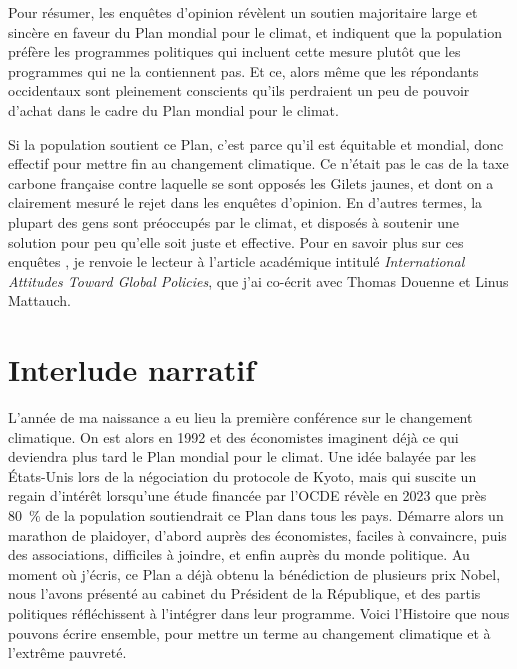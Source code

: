 \documentclass[a5paper,french,openany]{memoir}
\begin{document}
Pour résumer, les enquêtes d'opinion révèlent un soutien majoritaire large et sincère en faveur du Plan mondial pour le climat, et indiquent que la population préfère les programmes politiques qui incluent cette mesure plutôt que les programmes qui ne la contiennent pas. Et ce, alors même que les répondants occidentaux sont pleinement conscients qu'ils perdraient un peu de pouvoir d'achat dans le cadre du Plan mondial pour le climat. 

Si la population soutient ce Plan, c'est parce qu'il est équitable et mondial, donc effectif pour mettre fin au changement climatique. Ce n'était pas le cas de la taxe carbone française contre laquelle se sont opposés les Gilets jaunes, et dont on a clairement mesuré le rejet dans les enquêtes d'opinion. En d'autres termes, la plupart des gens sont préoccupés par le climat, et disposés à soutenir une solution pour peu qu'elle soit juste et effective. 
Pour en savoir plus sur ces enquêtes%
, je renvoie le lecteur à l'article académique intitulé \textit{International Attitudes Toward Global Policies}, que j'ai co-écrit avec Thomas Douenne et Linus Mattauch. 

\chapter{Interlude narratif}

L'année de ma naissance a eu lieu la première conférence sur le changement climatique. On est alors en 1992 et des économistes imaginent déjà ce qui deviendra plus tard le Plan mondial pour le climat. Une idée balayée par les États-Unis lors de la négociation du protocole de Kyoto, mais qui suscite un regain d'intérêt lorsqu'une étude financée par l'OCDE révèle en 2023 que près 80~\% de la population soutiendrait ce Plan dans tous les pays. Démarre alors un marathon de plaidoyer, d'abord auprès des économistes, faciles à convaincre, puis des associations, difficiles à joindre, 
et enfin auprès du monde politique. Au moment où j'écris, ce Plan a déjà obtenu la bénédiction de plusieurs prix Nobel, nous l'avons présenté au cabinet du Président de la République, et des partis politiques réfléchissent à l'intégrer dans leur programme. Voici l'Histoire que nous pouvons écrire ensemble, pour mettre un terme au changement climatique et à l'extrême pauvreté. 
\end{document}
